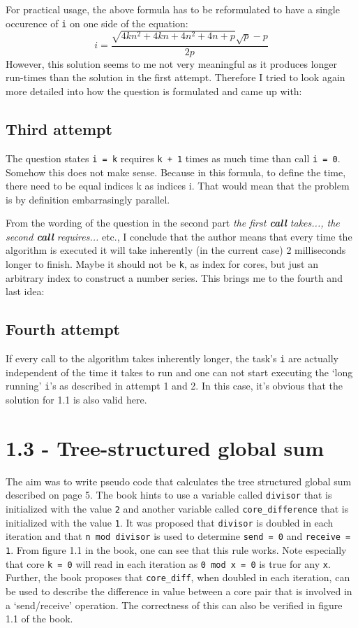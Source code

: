 \documentclass[a4paper,11pt,twoside]{article}
\begin{document}
For practical usage, the above formula has to be reformulated to have a single occurence of \verb+i+ on one side of the equation:
\begin{equation}
i=\frac{\sqrt{4kn^{2}+4kn+4n^{2}+4n+p}\sqrt{p}-p}{2p}
\end{equation}
However, this solution seems to me not very meaningful as it produces longer run-times than the solution in the first attempt. Therefore I tried to look again more detailed into how the question is formulated and came up with:

\subsection{Third attempt}
The question states \verb+i = k+ requires \verb!k + 1! times as much time than call \verb+i = 0+. Somehow this does not make sense. Because in this formula, to define the time, there need to be equal indices k as indices i. That would mean that the problem is by definition embarrasingly parallel.

From the wording of the question in the second part \textit{the first \textbf{call} takes..., the second \textbf{call} requires...} etc., I conclude that the author means that every time the algorithm is executed it will take inherently (in the current case) 2 milliseconds longer to finish. Maybe it should not be \verb+k+, as index for cores, but just an arbitrary index to construct a number series. This brings me to the fourth and last idea:

\subsection{Fourth attempt}
If every call to the algorithm takes inherently longer, the task's \verb+i+ are actually independent of the time it takes to run and one can not start executing the `long running' \verb+i+'s as described in attempt 1 and 2. In this case, it's obvious that the solution for 1.1 is also valid here. 

\section{1.3 - Tree-structured global sum}
The aim was to write pseudo code that calculates the tree structured global sum described on page 5. The book hints to use a variable called \verb+divisor+ that is initialized with the value \verb+2+ and another variable called \verb+core_difference+ that is initialized with the value \verb+1+. It was proposed that \verb+divisor+ is doubled in each iteration and that \verb+n mod divisor+ is used to determine \verb+send = 0+ and \verb+receive = 1+. From figure 1.1 in the book, one can see that this rule works. Note especially that core \verb+k = 0+ will read in each iteration as \verb+0 mod x = 0+ is true for any \verb+x+. Further, the book proposes that \verb+core_diff+, when doubled in each iteration, can be used to describe the difference in value between a core pair that is involved in a `send/receive' operation. The correctness of this can also be verified in figure 1.1 of the book.
\end{document}
